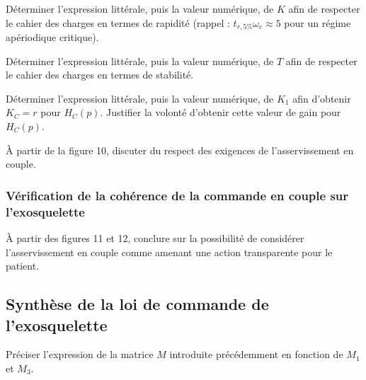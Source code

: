 \documentclass[11pt]{article}
\begin{document}
\UPSTIquestion Déterminer l'expression littérale, puis la valeur numérique, de $K$ afin de respecter le cahier des charges en termes de rapidité (rappel : $t_{r, 5 \%} \omega_{c} \approx 5$ pour un régime apériodique critique).
\begin{UPSTIcorrige}

\end{UPSTIcorrige}

\UPSTIquestion Déterminer l'expression littérale, puis la valeur numérique, de $T$ afin de respecter le cahier des charges en termes de stabilité.
\begin{UPSTIcorrige}

\end{UPSTIcorrige}

\UPSTIquestion  Déterminer l'expression littérale, puis la valeur numérique, de $K_{1}$ afin d'obtenir $K_{C}=r$ pour $H_{C}(p)$. Justifier la volonté d'obtenir cette valeur de gain pour $H_{C}(p)$.
\begin{UPSTIcorrige}

\end{UPSTIcorrige}

\UPSTIquestion À partir de la figure 10, discuter du respect des exigences de l'asservissement en couple.
\begin{UPSTIcorrige}

\end{UPSTIcorrige}

\subsubsection{Vérification de la cohérence de la commande en couple sur l’exosquelette}

\UPSTIquestion À partir des figures 11 et 12, conclure sur la possibilité de considérer l'asservissement en couple comme amenant une action transparente pour le patient.
\begin{UPSTIcorrige}

\end{UPSTIcorrige}

\subsection{Synthèse de la loi de commande de l'exosquelette}

\begin{UPSTIcorrige}

\end{UPSTIcorrige}

\UPSTIquestion Préciser l'expression de la matrice $M$ introduite précédemment en fonction de $M_{1}$ et $M_{3}$.
\begin{UPSTIcorrige}

\end{UPSTIcorrige}
\end{document}
